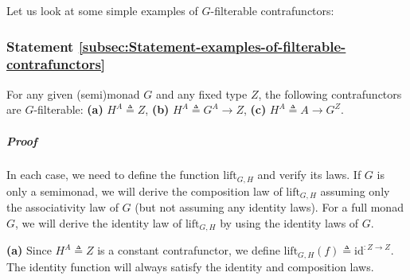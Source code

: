 Let us look at some simple examples of $G$-filterable contrafunctors:

\subsubsection{Statement \label{subsec:Statement-examples-of-filterable-contrafunctors}\ref{subsec:Statement-examples-of-filterable-contrafunctors}}

For any given (semi)monad $G$ and any fixed type $Z$, the following
contrafunctors are $G$-filterable: \textbf{(a)} $H^{A}\triangleq Z$,
\textbf{(b)} $H^{A}\triangleq G^{A}\rightarrow Z$, \textbf{(c)} $H^{A}\triangleq A\rightarrow G^{Z}$.

\subparagraph{Proof}

In each case, we need to define the function $\text{lift}_{G,H}$
and verify its laws. If $G$ is only a semimonad, we will derive the
composition law of $\text{lift}_{G,H}$ assuming only the associativity
law of $G$ (but not assuming any identity laws). For a full monad
$G$, we will derive the identity law of $\text{lift}_{G,H}$ by using
the identity laws of $G$. 

\textbf{(a)} Since $H^{A}\triangleq Z$ is a constant contrafunctor,
we define $\text{lift}_{G,H}(f)\triangleq\text{id}^{:Z\rightarrow Z}$.
The identity function will always satisfy the identity and composition
laws.

